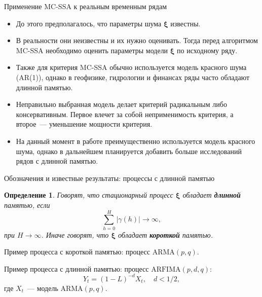 \documentclass[pdf,notheorems,10pt,intlimits,unicode]{beamer}
\newtheorem{definition}{Определение}
\begin{document}
\begin{frame}{Применение MC-SSA к реальным временным рядам}

    \begin{itemize}
        \item До этого предполагалось, что параметры шума $\bm\xi$ известны.\medskip
        \item В реальности они неизвестны и их нужно оценивать. Тогда перед алгоритмом MC-SSA необходимо оценить параметры модели $\bm\xi$ по исходному ряду.\medskip
        \item Также для критерия MC-SSA обычно используется модель красного шума (AR(1)), однако в геофизике, гидрологии и финансах ряды часто обладают длинной памятью.\medskip
        \item Неправильно выбранная модель делает критерий радикальным либо консервативным. Первое влечет за собой неприменимость критерия, а второе~--- уменьшение мощности критерия.\medskip
        \item На данный момент в работе преимущественно используется модель красного шума, однако в дальнейшем планируется добавить больше исследований рядов с длинной памятью.
    \end{itemize}

\end{frame}

\begin{frame}{Обозначения и известные результаты: процессы с длинной памятью}

    \begin{definition}
        Говорят, что стационарный процесс $\bm\xi$ обладает \textbf{длинной} памятью, если
        \[
            \sum_{h=0}^H|\gamma(h)| \rightarrow \infty,
        \]
        при $H\to\infty$. Иначе говорят, что $\bm\xi$ обладает \textbf{короткой} памятью.
    \end{definition}\medskip

    Пример процесса с короткой памятью: процесс $\text{ARMA}(p, q)$.\medskip

    Пример процесса с длинной памятью: процесс $\text{ARFIMA}(p, d, q)$:
    \[
        Y_t=(1-L)^{-d}X_t, \quad d < 1 / 2,
    \]
    где $X_t$~--- модель $\text{ARMA}(p, q)$.

\end{frame}
\end{document}
